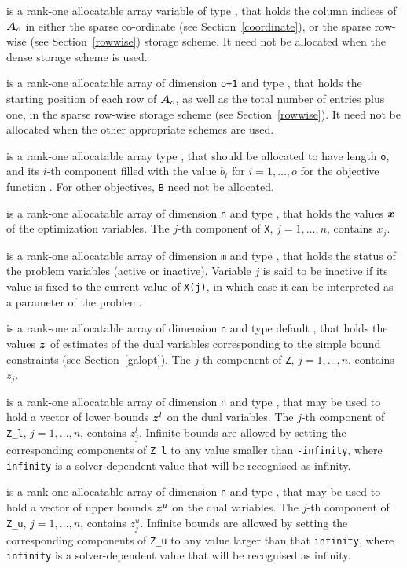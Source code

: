 \documentclass{galahad}
\begin{document}
\begin{description}
\begin{description}
 is a rank-one allocatable array variable of type \integer,
that holds the column indices of ${\bm{A}}_o$ in either the sparse co-ordinate
(see Section~\ref{coordinate}), or the sparse row-wise
(see Section~\ref{rowwise}) storage scheme.
It need not be allocated when the dense storage scheme is used.

 is a rank-one allocatable array of dimension {\tt o+1} and type
\integer, that holds the starting position of each row of ${\bm{A}}_o$, as well
as the total number of entries plus one, in the sparse row-wise storage
scheme (see Section~\ref{rowwise}). It need not be allocated when the
other appropriate schemes are used.

\end{description}

 is a rank-one allocatable array type \realdp, that
should be allocated to have length {\tt o}, and its $i$-th component
filled with the value $b_{i}$ for $i = 1, \ldots , o$ for the
objective function . 
For other objectives, {\tt B} need not be allocated.

 is a rank-one allocatable array of dimension {\tt n} and type
\realdp,
that holds the values ${\bm{x}}$ of the optimization variables.
The $j$-th component of {\tt X}, $j = 1,  \ldots , n$, contains $x_{j}$.

 is a rank-one allocatable array of dimension {\tt m} and type
\integer, that holds the status of the problem variables (active or
inactive). Variable $j$ is said to be inactive if its value is fixed to the
current value of {\tt X(j)}, in which case it can be interpreted as a
parameter of the problem.

 is a rank-one allocatable array of dimension {\tt n} and type default
\realdp, that holds
the values ${\bm{z}}$ of estimates  of the dual variables
corresponding to the simple bound constraints (see Section~\ref{galopt}).
The $j$-th component of {\tt Z}, $j = 1,  \ldots ,  n$, contains $z_{j}$.

 is a rank-one allocatable array of dimension {\tt n} and type
\realdp, that may be used to hold
a vector of lower bounds ${\bm{z}}^{l}$ on the dual variables.
The $j$-th component of {\tt Z\_l}, $j = 1, \ldots , n$,
contains $z_{j}^{l}$.
Infinite bounds are allowed by setting the corresponding
components of {\tt Z\_l} to any value smaller than {\tt -infinity},
where {\tt infinity} is a  solver-dependent value that will be recognised as
infinity.

 is a rank-one allocatable array of dimension {\tt n} and type
\realdp, that may be used to hold
a vector of upper bounds ${\bm{z}}^{u}$ on the dual variables.
The $j$-th component of {\tt Z\_u}, $j = 1, \ldots , n$,
contains $z_{j}^{u}$.
Infinite bounds are allowed by setting the corresponding
components of {\tt Z\_u} to any value larger than that {\tt infinity},
where {\tt infinity} is a  solver-dependent value that will be recognised as
infinity.


\end{description}
\end{document}
